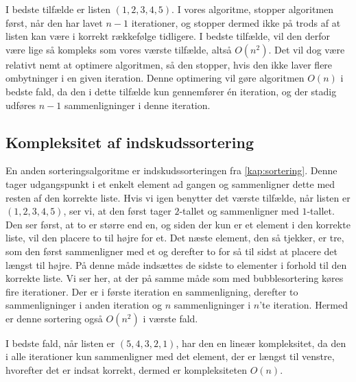 I bedste tilfælde er listen $(1, 2, 3, 4, 5)$.
I vores algoritme, stopper algoritmen først, når den har lavet $n-1$ iterationer, og stopper dermed ikke på trods af at listen kan være i korrekt rækkefølge tidligere. I bedste tilfælde, vil den derfor være lige så kompleks som vores værste tilfælde, altså $O(n^2)$. Det vil dog være relativt nemt at optimere algoritmen, så den stopper, hvis den ikke laver flere ombytninger i en given iteration. Denne optimering vil gøre algoritmen $O(n)$ i bedste fald, da den i dette tilfælde kun gennemfører én iteration, og der stadig udføres $n-1$ sammenligninger i denne iteration. 

\subsection{Kompleksitet af indskudssortering} \label{kap:kom_indskud}
En anden sorteringsalgoritme er indskudssorteringen fra \autoref{kap:sortering}. Denne tager udgangspunkt i et enkelt element ad gangen og sammenligner dette med resten af den korrekte liste.
Hvis vi igen benytter det værste tilfælde, når listen er $(1,2,3,4,5)$, ser vi, at den først tager $2$-tallet og sammenligner med $1$-tallet. Den ser først, at to er større end en, og siden der kun er et element i den korrekte liste, vil den placere to til højre for et. Det næste element, den så tjekker, er tre, som den først sammenligner med et og derefter to for så til sidst at placere det længst til højre. På denne måde indsættes de sidste to elementer i forhold til den korrekte liste.
Vi ser her, at der på samme måde som med bubblesortering køres fire iterationer. Der er i første iteration en sammenligning, derefter to sammenligninger i anden iteration og $n$ sammenligninger i $n$'te iteration. Hermed er denne sortering også $O(n^2)$ i værste fald.


I bedste fald, når listen er $(5,4,3,2,1)$, har den en lineær kompleksitet, da den i alle iterationer kun sammenligner med det element, der er længst til venstre, hvorefter det er indsat korrekt, dermed er kompleksiteten $O(n)$.





